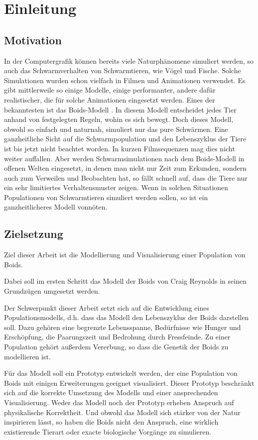 \documentclass[draft=false
              ,paper=a4
              ,twoside=false
              ,fontsize=11pt
              ,headsepline
              ,BCOR10mm
              ,DIV11
              ,bibtotoc
              ,liststotoc
              ]{scrbook}
\begin{document}
\chapter{Einleitung}\label{einleitung}
\section{Motivation}
In der Computergrafik können bereits viele Naturphänomene simuliert werden, so auch das Schwarmverhalten von Schwarmtieren, wie Vögel und Fische.
Solche Simulationen wurden schon vielfach in Filmen und Animationen verwendet. Es gibt mittlerweile so einige Modelle, einige performanter, andere dafür realistischer, die für solche Animationen eingesetzt werden. Eines der bekanntesten ist das Boids-Modell \cite{reynolds87}. In diesem Modell entscheidet jedes Tier anhand von festgelegten Regeln, wohin es sich bewegt. Doch dieses Modell, obwohl so einfach und naturnah, simuliert nur das pure Schwärmen. Eine ganzheitliche Sicht auf die Schwarmpopulation und den Lebenszyklus der Tiere ist bis jetzt nicht beachtet worden. In kurzen Filmsequenzen mag dies nicht weiter auffallen. Aber werden Schwarmsimulationen nach dem Boids-Modell in offenen Welten eingesetzt, in denen man nicht nur Zeit zum Erkunden, sondern auch zum Verweilen und Beobachten hat, so fällt schnell auf, dass die Tiere nur ein sehr limitiertes Verhaltensmuster zeigen.
Wenn in solchen Situationen Populationen von Schwarmtieren simuliert werden sollen, so ist ein ganzheitlicheres Modell vonnöten.

\section{Zielsetzung}
Ziel dieser Arbeit ist die Modellierung und Visualisierung einer Population von Boids.

Dabei soll im ersten Schritt das Modell der Boids von Craig Reynolds \cite{reynolds87} in seinen Grundzügen umgesetzt werden. 

Der Schwerpunkt dieser Arbeit setzt sich auf die Entwicklung eines Populationsmodells, d.h. dass das Modell den Lebenszyklus der Boids darstellen soll. Dazu gehören eine begrenzte Lebensspanne, Bedürfnisse wie Hunger und Erschöpfung, die Paarungszeit und Bedrohung durch Fressfeinde.
Zu einer Population gehört außerdem Vererbung, so dass die Genetik der Boids zu modellieren ist.

Für das Modell soll ein Prototyp entwickelt werden, der eine Population von Boids mit einigen Erweiterungen geeignet visualisiert.
Dieser Prototyp beschränkt sich auf die korrekte Umsetzung des Modells und einer ansprechenden Visualisierung. Weder das Modell noch der Prototyp erheben Anspruch auf physikalische Korrektheit. Und obwohl das Modell sich stärker von der Natur inspirieren lässt, so haben die Boids nicht den Anspruch, eine wirklich existierende Tierart oder exacte biologische Vorgänge zu simulieren.
\end{document}
